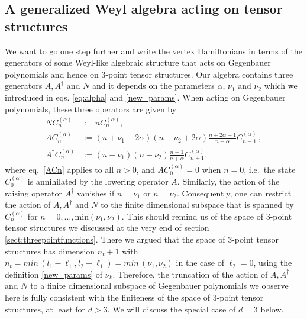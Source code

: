 \documentclass{article}
\def \ag {\alpha}
\begin{document}
\subsection{A generalized Weyl algebra acting on tensor structures}
\label{sec:Weyl}

We want to go one step further and write the vertex Hamiltonians in terms of the 
generators of some Weyl-like algebraic structure that acts on Gegenbauer polynomials
and hence on 3-point tensor structures. Our algebra contains three generators $A,A^\dagger$
and $N$ and it depends on the parameters $\ag$, $\nu_1$ and $\nu_2$ which we introduced in 
eqs. \eqref{eq:alpha} and \eqref{new_params}. When acting on Gegenbauer polynomials, these 
three operators are given by 
\begin{align}
    N C_n^{(\ag)} &:= n C_n^{(\ag)}, \label{NCn} \\
    A C_n^{(\ag)} &:= (n+ \nu_1+2\ag)(n+\nu_2+2\ag) 
    \frac{n+2\ag-1}{n+\ag} C_{n-1}^{(\ag)}\,,\label{ACn} \\
    A^{\dagger} C_n^{(\ag)} &:= (n-\nu_1)(n-\nu_2) \frac{n+1}{n+\ag} 
    C_{n+1}^{(\ag)}, \label{A*Cn}
\end{align}
where eq.\ \eqref{ACn} applies to all $n>0$, and $A C_0^{(\ag)} = 0$ when $n=0$, i.e.\ the 
state $C_0^{(\ag)}$ is annihilated by the lowering operator $A$. Similarly, 
the action of the raising operator $A^\dagger$ vanishes if $n=\nu_1$ or $n=\nu_2$.
Consequently, one can restrict the action of $A,A^\dagger$ and $N$ to the finite 
dimensional subspace that is spanned by $C_n^{(\ag)}$ for $n = 0,\dots,\mathrm{min}
(\nu_1,\nu_2)$. This should remind us of the space of 3-point tensor structures we discussed 
at the very end of section \ref{sect:threepointfunctions}. There we argued that the space of 
3-point tensor structures has dimension $n_t+1$ with $n_t = \textit{min}\, (l_1 - \ell_1, l_2 - \ell_1)= \textit{min}\, 
(\nu_1, \nu_2)$ in the case of $\ell_2=0$, using the definition \eqref{new_params} of $\nu_k$. Therefore, the truncation of the 
action of $A,A^\dagger$ and $N$ to a finite dimensional subspace of 
Gegenbauer polynomials we observe here is fully consistent with the 
finiteness of the space of 3-point tensor structures, at least for 
$d > 3$. We will discuss the special case of $d=3$ below. 
\smallskip 
\end{document}
